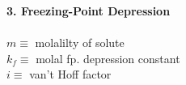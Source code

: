 \begin{minipage}{0.32\linewidth}
    \textbf{3. Freezing-Point Depression}\\
    \\
    $m \equiv$ molalilty of solute\\
    $k_f \equiv$ molal fp. depression constant\\
    $i \equiv$ van't Hoff factor
\end{minipage}

